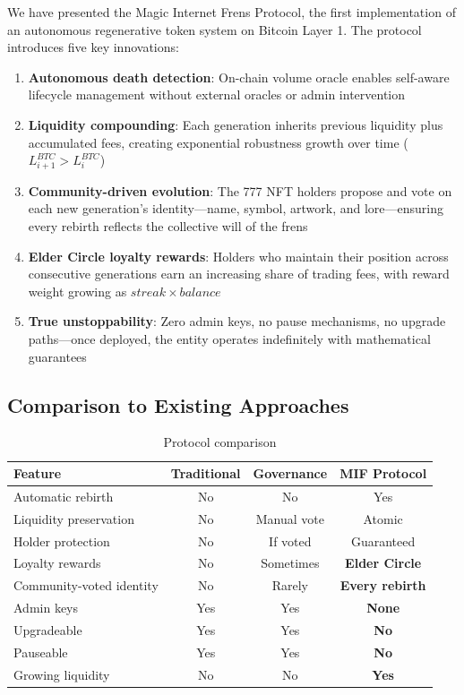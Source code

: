 \documentclass[11pt,a4paper]{article}
\begin{document}
We have presented the Magic Internet Frens Protocol, the first implementation of an autonomous regenerative token system on Bitcoin Layer 1. The protocol introduces five key innovations:

\begin{enumerate}
    \item \textbf{Autonomous death detection}: On-chain volume oracle enables self-aware lifecycle management without external oracles or admin intervention

    \item \textbf{Liquidity compounding}: Each generation inherits previous liquidity plus accumulated fees, creating exponential robustness growth over time ($L_{i+1}^{BTC} > L_i^{BTC}$)

    \item \textbf{Community-driven evolution}: The 777 NFT holders propose and vote on each new generation's identity---name, symbol, artwork, and lore---ensuring every rebirth reflects the collective will of the frens

    \item \textbf{Elder Circle loyalty rewards}: Holders who maintain their position across consecutive generations earn an increasing share of trading fees, with reward weight growing as $streak \times balance$

    \item \textbf{True unstoppability}: Zero admin keys, no pause mechanisms, no upgrade paths---once deployed, the entity operates indefinitely with mathematical guarantees
\end{enumerate}

\subsection{Comparison to Existing Approaches}

\begin{table}[h]
\centering
\begin{tabular}{|l|c|c|c|}
\hline
\textbf{Feature} & \textbf{Traditional} & \textbf{Governance} & \textbf{MIF Protocol} \\
\hline
Automatic rebirth & No & No & Yes \\
Liquidity preservation & No & Manual vote & Atomic \\
Holder protection & No & If voted & Guaranteed \\
Loyalty rewards & No & Sometimes & \textbf{Elder Circle} \\
Community-voted identity & No & Rarely & \textbf{Every rebirth} \\
Admin keys & Yes & Yes & \textbf{None} \\
Upgradeable & Yes & Yes & \textbf{No} \\
Pauseable & Yes & Yes & \textbf{No} \\
Growing liquidity & No & No & \textbf{Yes} \\
\hline
\end{tabular}
\caption{Protocol comparison}
\end{table}
\end{document}
